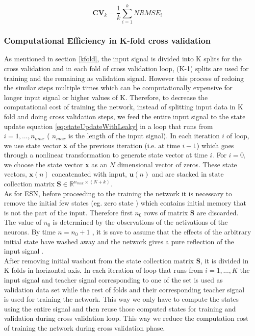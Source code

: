  \begin{equation}
	 \mathbf{CV}_k = \frac{1}{k} \sum^k_{i=1}{NRMSE_i}
	 \label{eq:crossValidaion}
	 \end{equation}
\subsubsection{Computational Efficiency in K-fold cross validation}
As mentioned in section \ref{kfold}, the input signal is divided into K splits for the cross validation and in each fold of cross validation loop, (K-1) splits are used for training and the remaining as validation signal. However this process of redoing the similar steps multiple times which can be computationally expensive for longer input signal or higher values of K. Therefore, to decrease the computational cost of training the network, instead of splitting input data in K fold and doing cross validation steps, we feed the entire input signal to the state update equation \eqref{eq:stateUpdateWithLeaky} in a loop that runs from  $i = 1,\hdots,{n_{max}}$ ( ${n_{max}}$ is the length of the input signal). In each iteration $i$ of loop, we  use state vector \textbf{x} of the previous iteration (i.e. at time $i-1$) which goes through a nonlinear transformation to generate state vector at time $i$. For $i = 0$,  we choose the	state vector \textbf{x} as an $N$ dimensional vector of zeros. These state vectors, $\mathbf{x}(n)$ concatenated with input, $\mathbf{u}(n)$ and are stacked in state collection matrix $\mathbf{S} \in \mathbb{R}^{n_{max} \times (N+k)}$.  \\
As for ESN, before proceeding to the training the network it is necessary to remove the initial few states (eg. zero state ) which contains initial memory that is not the part of the input. Therefore first $n_0$ rows of matrix $\mathbf{S}$ are discarded. The value of $n_0$ is determined by the observations of the activations of the neurons. By time $n = n_0+1$ , it is save to assume that the effects of the arbitrary initial state have washed away and the network gives a pure reflection of the input signal \cite{jingdai}. \\

After removing initial washout from the state collection matrix $\mathbf{S}$, it is divided in K folds in horizontal axis. In each iteration of loop that runs from $i=1,\hdots,K$ the input signal and teacher signal corresponding to one of the set is used as validation data set while the rest of folds and their corresponding teacher signal is used for training the network. This way we only have to compute the states using the entire signal and then reuse those computed states for training and validation during cross validation loop. This way we reduce the computation cost of training the network during cross validation phase.

